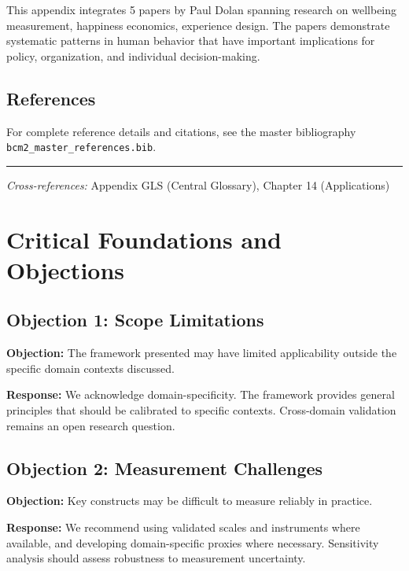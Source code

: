 This appendix integrates 5 papers by Paul Dolan
spanning research on wellbeing measurement, happiness economics, experience design.
The papers demonstrate systematic patterns in human behavior that have important
implications for policy, organization, and individual decision-making.

\subsection{References}

For complete reference details and citations, see the master bibliography
\texttt{bcm2\_master\_references.bib}.

\vspace{1em}
\hrule
\vspace{0.5em}

\noindent\textit{Cross-references:}
Appendix GLS (Central Glossary), Chapter 14 (Applications)



\section{Critical Foundations and Objections}
\label{sec:dol-foundations}

\subsection{Objection 1: Scope Limitations}

\textbf{Objection:} The framework presented may have limited applicability
outside the specific domain contexts discussed.

\textbf{Response:} We acknowledge domain-specificity. The framework provides
general principles that should be calibrated to specific contexts. Cross-domain
validation remains an open research question.

\subsection{Objection 2: Measurement Challenges}

\textbf{Objection:} Key constructs may be difficult to measure reliably in
practice.

\textbf{Response:} We recommend using validated scales and instruments where
available, and developing domain-specific proxies where necessary. Sensitivity
analysis should assess robustness to measurement uncertainty.



